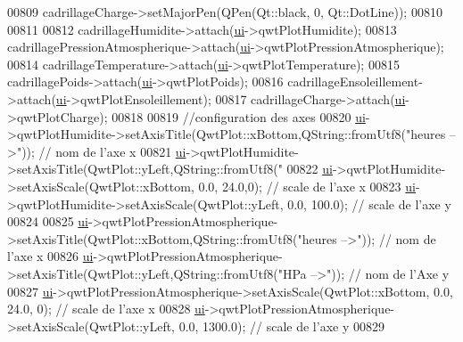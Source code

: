 \begin{DoxyCode}
00809     cadrillageCharge->setMajorPen(QPen(Qt::black, 0, Qt::DotLine));
00810 
00811 
00812     cadrillageHumidite->attach(\hyperlink{class_ruche_ihm_a64786058bd7f88ca2f1e9743bb27c25b}{ui}->qwtPlotHumidite);
00813     cadrillagePressionAtmospherique->attach(\hyperlink{class_ruche_ihm_a64786058bd7f88ca2f1e9743bb27c25b}{ui}->qwtPlotPressionAtmospherique);
00814     cadrillageTemperature->attach(\hyperlink{class_ruche_ihm_a64786058bd7f88ca2f1e9743bb27c25b}{ui}->qwtPlotTemperature);
00815     cadrillagePoids->attach(\hyperlink{class_ruche_ihm_a64786058bd7f88ca2f1e9743bb27c25b}{ui}->qwtPlotPoids);
00816     cadrillageEnsoleillement->attach(\hyperlink{class_ruche_ihm_a64786058bd7f88ca2f1e9743bb27c25b}{ui}->qwtPlotEnsoleillement);
00817     cadrillageCharge->attach(\hyperlink{class_ruche_ihm_a64786058bd7f88ca2f1e9743bb27c25b}{ui}->qwtPlotCharge);
00818 
00819     \textcolor{comment}{//configuration des axes}
00820     \hyperlink{class_ruche_ihm_a64786058bd7f88ca2f1e9743bb27c25b}{ui}->qwtPlotHumidite->setAxisTitle(QwtPlot::xBottom,QString::fromUtf8(\textcolor{stringliteral}{"heures -->"})); \textcolor{comment}{// nom de l'axe
       x}
00821     \hyperlink{class_ruche_ihm_a64786058bd7f88ca2f1e9743bb27c25b}{ui}->qwtPlotHumidite->setAxisTitle(QwtPlot::yLeft,QString::fromUtf8(\textcolor{stringliteral}{"%
00822     \hyperlink{class_ruche_ihm_a64786058bd7f88ca2f1e9743bb27c25b}{ui}->qwtPlotHumidite->setAxisScale(QwtPlot::xBottom, 0.0, 24.0,0); \textcolor{comment}{// scale de l'axe x}
00823     \hyperlink{class_ruche_ihm_a64786058bd7f88ca2f1e9743bb27c25b}{ui}->qwtPlotHumidite->setAxisScale(QwtPlot::yLeft, 0.0, 100.0); \textcolor{comment}{// scale de l'axe y}
00824 
00825     \hyperlink{class_ruche_ihm_a64786058bd7f88ca2f1e9743bb27c25b}{ui}->qwtPlotPressionAtmospherique->setAxisTitle(QwtPlot::xBottom,QString::fromUtf8(\textcolor{stringliteral}{"heures -->"})); \textcolor{comment}{//
       nom de l'axe x}
00826     \hyperlink{class_ruche_ihm_a64786058bd7f88ca2f1e9743bb27c25b}{ui}->qwtPlotPressionAtmospherique->setAxisTitle(QwtPlot::yLeft,QString::fromUtf8(\textcolor{stringliteral}{"HPa -->"})); \textcolor{comment}{// nom
       de l'Axe y}
00827     \hyperlink{class_ruche_ihm_a64786058bd7f88ca2f1e9743bb27c25b}{ui}->qwtPlotPressionAtmospherique->setAxisScale(QwtPlot::xBottom, 0.0, 24.0, 0); \textcolor{comment}{// scale de l'axe x}
00828     \hyperlink{class_ruche_ihm_a64786058bd7f88ca2f1e9743bb27c25b}{ui}->qwtPlotPressionAtmospherique->setAxisScale(QwtPlot::yLeft, 0.0, 1300.0); \textcolor{comment}{// scale de l'axe y}
00829 
}
\end{DoxyCode}
